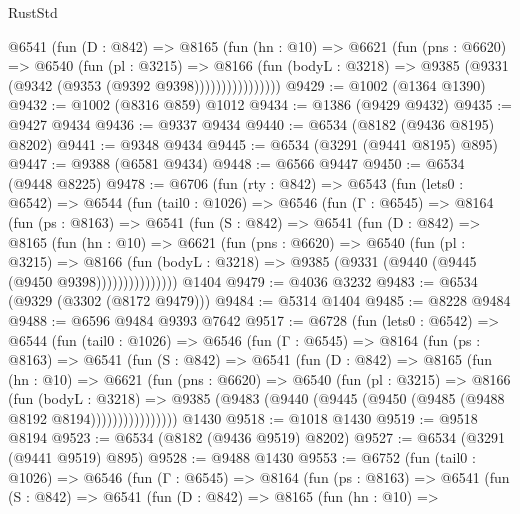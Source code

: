 \begin{lexlean}{RustStd}
\begin{coremodule}
                @6541
                  (fun (D : @842) =>
                  @8165
                    (fun (hn : @10) =>
                    @6621
                      (fun (pns : @6620) =>
                      @6540
                        (fun (pl : @3215) =>
                        @8166
                          (fun (bodyL : @3218) =>
                          @9385 (@9331 (@9342 (@9353 (@9392 @9398))))))))))))))))
@9429 := @1002 (@1364 @1390)
@9432 := @1002 (@8316 @859) @1012
@9434 := @1386 (@9429 @9432)
@9435 := @9427 @9434
@9436 := @9337 @9434
@9440 := @6534 (@8182 (@9436 @8195) @8202)
@9441 := @9348 @9434
@9445 := @6534 (@3291 (@9441 @8195) @895)
@9447 := @9388 (@6581 @9434)
@9448 := @6566 @9447
@9450 := @6534 (@9448 @8225)
@9478 := @6706
    (fun (rty : @842) =>
    @6543
      (fun (lets0 : @6542) =>
      @6544
        (fun (tail0 : @1026) =>
        @6546
          (fun (Γ : @6545) =>
          @8164
            (fun (ps : @8163) =>
            @6541
              (fun (S : @842) =>
              @6541
                (fun (D : @842) =>
                @8165
                  (fun (hn : @10) =>
                  @6621
                    (fun (pns : @6620) =>
                    @6540
                      (fun (pl : @3215) =>
                      @8166
                        (fun (bodyL : @3218) =>
                        @9385 (@9331 (@9440 (@9445 (@9450 @9398)))))))))))))))
    @1404
@9479 := @4036 @3232
@9483 := @6534 (@9329 (@3302 (@8172 @9479)))
@9484 := @5314 @1404
@9485 := @8228 @9484
@9488 := @6596 @9484 @9393 @7642
@9517 := @6728
    (fun (lets0 : @6542) =>
    @6544
      (fun (tail0 : @1026) =>
      @6546
        (fun (Γ : @6545) =>
        @8164
          (fun (ps : @8163) =>
          @6541
            (fun (S : @842) =>
            @6541
              (fun (D : @842) =>
              @8165
                (fun (hn : @10) =>
                @6621
                  (fun (pns : @6620) =>
                  @6540
                    (fun (pl : @3215) =>
                    @8166
                      (fun (bodyL : @3218) =>
                      @9385 (@9483 (@9440 (@9445 (@9450 (@9485 (@9488 @8192 @8194))))))))))))))))
    @1430
@9518 := @1018 @1430
@9519 := @9518 @8194
@9523 := @6534 (@8182 (@9436 @9519) @8202)
@9527 := @6534 (@3291 (@9441 @9519) @895)
@9528 := @9488 @1430
@9553 := @6752
    (fun (tail0 : @1026) =>
    @6546
      (fun (Γ : @6545) =>
      @8164
        (fun (ps : @8163) =>
        @6541
          (fun (S : @842) =>
          @6541
            (fun (D : @842) =>
            @8165
              (fun (hn : @10) =>

\end{coremodule}
\end{lexlean}
